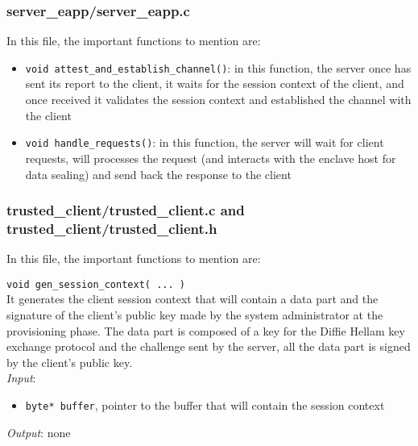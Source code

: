 \subsubsection{server\_eapp/server\_eapp.c}
In this file, the important functions to mention are:
\begin{itemize}
  \item \texttt{void attest\_and\_establish\_channel()}: in this function, the server once has sent its report to the client, it waits for the session context of the client, and once received it validates the session context and established the channel with the client
  \item \texttt{void handle\_requests()}: in this function, the server will wait for client requests, will processes the request (and interacts with the enclave host for data sealing) and send back the response to the client 
\end{itemize}
 
\subsubsection{trusted\_client/trusted\_client.c and trusted\_client/trusted\_client.h}
In this file, the important functions to mention are:

\noindent
\texttt{void gen\_session\_context( ... )}\\
It generates the client session context that will contain a data part and the signature of the client's public key made by the system administrator at the provisioning phase. The data part is composed of a key for the Diffie Hellam key exchange protocol and the challenge sent by the server, all the data part is signed by the client's public key. \\
\textit{Input}:
\begin{itemize}[noitemsep,nolistsep]
  \item \texttt{byte* buffer}, pointer to the buffer that will contain the session context
\end{itemize}
\textit{Output}: none


